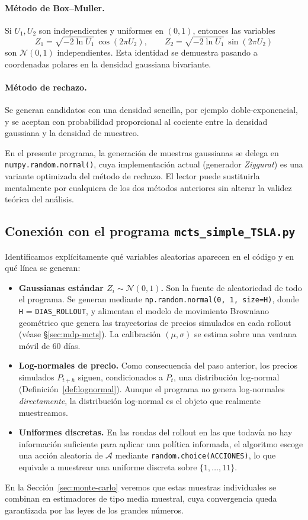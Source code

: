 \paragraph{Método de Box--Muller.} Si $U_1, U_2$ son independientes y uniformes en $(0,1)$, entonces las variables
\[
    Z_1 = \sqrt{-2\ln U_1}\,\cos(2\pi U_2),
    \qquad
    Z_2 = \sqrt{-2\ln U_1}\,\sin(2\pi U_2)
\]
son $\mathcal{N}(0,1)$ independientes. Esta identidad se demuestra pasando a coordenadas polares en la densidad gaussiana bivariante.

\paragraph{Método de rechazo.} Se generan candidatos con una densidad sencilla, por ejemplo doble-exponencial, y se aceptan con probabilidad proporcional al cociente entre la densidad gaussiana y la densidad de muestreo.

En el presente programa, la generación de muestras gaussianas se delega en \\ \texttt{numpy.random.normal()}, cuya implementación actual (generador \emph{Ziggurat}) es una variante optimizada del método de rechazo. El lector puede sustituirla mentalmente por cualquiera de los dos métodos anteriores sin alterar la validez teórica del análisis.

\subsection{Conexión con el programa \texttt{mcts\_simple\_TSLA.py}}
\label{subsec:conexion-programa-va}

Identificamos explícitamente qué variables aleatorias aparecen en el código y en qué línea se generan:

\begin{itemize}
    \item \textbf{Gaussianas estándar $Z_i \sim \mathcal{N}(0,1)$.} Son la fuente de aleatoriedad de todo el programa. Se generan mediante \texttt{np.random.normal(0, 1, size=H)}, donde \texttt{H} = \texttt{DIAS\_ROLLOUT}, y alimentan el modelo de movimiento Browniano geométrico que genera las trayectorias de precios simulados en cada rollout (véase §\ref{sec:mdp-mcts}). La calibración $(\mu, \sigma)$ se estima sobre una ventana móvil de 60 días.

    \item \textbf{Log-normales de precio.} Como consecuencia del paso anterior, los precios simulados $P_{t+h}$ siguen, condicionados a $P_t$, una distribución log-normal (Definición~\ref{def:lognormal}). Aunque el programa no genera log-normales \emph{directamente}, la distribución log-normal es el objeto que realmente muestreamos.

    \item \textbf{Uniformes discretas.} En las rondas del rollout en las que todavía no hay información suficiente para aplicar una política informada, el algoritmo escoge una acción aleatoria de $\mathcal{A}$ mediante \texttt{random.choice(ACCIONES)}, lo que equivale a muestrear una uniforme discreta sobre $\{1, \ldots, 11\}$.
\end{itemize}

En la Sección~\ref{sec:monte-carlo} veremos que estas muestras individuales se combinan en estimadores de tipo media muestral, cuya convergencia queda garantizada por las leyes de los grandes números.
